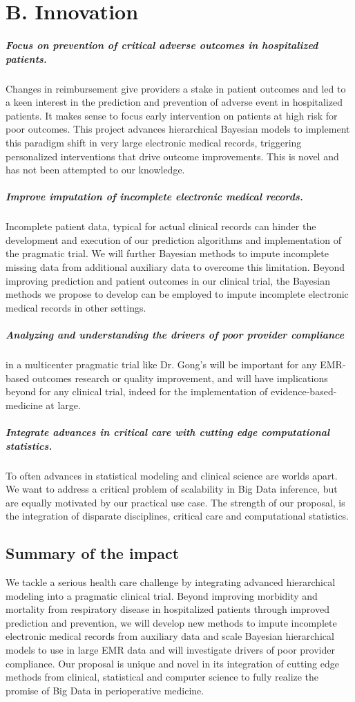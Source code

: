 \documentclass[11pt,notitlepage]{article}
\begin{document}
\section*{B. Innovation}
\subparagraph*{Focus on prevention of critical adverse outcomes in hospitalized patients.}
Changes in reimbursement give providers a stake in patient outcomes and led to a keen interest in the prediction and prevention of adverse event in hospitalized patients. It makes sense to focus early intervention on patients at high risk for poor outcomes. This project advances hierarchical Bayesian models to implement this paradigm shift in very large electronic medical records, triggering personalized interventions that drive outcome improvements. This is novel and has not been attempted to our knowledge.

\subparagraph*{Improve imputation of incomplete electronic medical records.}
Incomplete patient data, typical for actual clinical records can hinder the development and execution of our prediction algorithms and implementation of the pragmatic trial. We will further Bayesian methods to impute incomplete missing data from additional auxiliary data to overcome this limitation. Beyond improving prediction and patient outcomes in our clinical trial, the Bayesian methods we propose to develop can be employed to impute incomplete electronic medical records in other settings.

\subparagraph{Analyzing and understanding the drivers of poor provider compliance} in a multicenter pragmatic trial like Dr. Gong's will be important for any EMR-based outcomes research or quality improvement, and will have implications beyond for any clinical trial, indeed for the implementation of evidence-based-medicine at large.

\subparagraph*{Integrate advances in critical care with cutting edge computational statistics.}
To often advances in statistical modeling and clinical science are worlds apart. We want to address a critical problem of scalability in Big Data inference, but are equally motivated by our practical use case. The strength of our proposal, is the integration of disparate disciplines, critical care and computational statistics. 

\subsection*{Summary of the impact}
We tackle a serious health care challenge by integrating advanced hierarchical modeling into a pragmatic clinical trial. Beyond improving morbidity and mortality from respiratory disease in hospitalized patients through improved prediction and prevention, we will develop new methods to impute incomplete electronic medical records from auxiliary data and scale Bayesian hierarchical models to use in large EMR data and will investigate drivers of poor provider compliance. Our proposal is unique and novel in its integration of cutting edge methods from clinical, statistical and computer science to fully realize the promise of Big Data in perioperative medicine.
\end{document}
